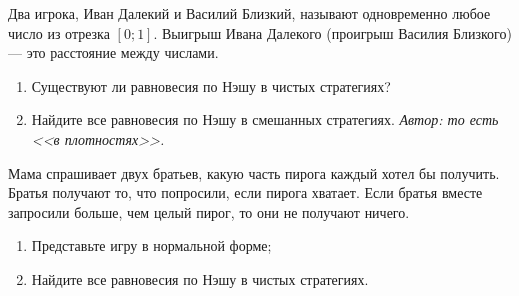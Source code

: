 \begin{problem}\par
Два игрока, Иван Далекий и Василий Близкий, называют одновременно любое число из отрезка  $\left[0;1\right]$. Выигрыш Ивана Далекого (проигрыш Василия Близкого) --- это расстояние между числами.\par
\begin{enumerate}
\item 	Существуют ли равновесия по Нэшу в чистых стратегиях?\par
\item 	Найдите все равновесия по Нэшу в смешанных стратегиях.
{\it \red Автор: то есть <<в плотностях>>. }
\end{enumerate}


\begin{sol}

\end{sol}
\end{problem}



\begin{problem}
Мама спрашивает двух братьев, какую часть пирога каждый хотел бы получить. Братья получают то, что попросили, если пирога хватает. Если братья вместе запросили больше, чем целый пирог, то они не получают ничего.\par
\begin{enumerate}
\item 	Представьте игру в нормальной форме;\par
\item 	Найдите все равновесия по Нэшу в чистых стратегиях.
\end{enumerate}


\begin{sol}

\end{sol}
\end{problem}



